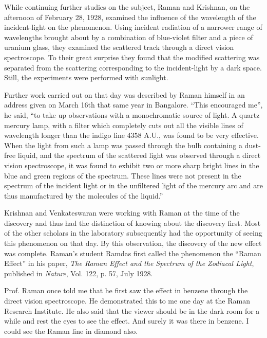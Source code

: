 While continuing further studies on the subject, Raman and\break
Krishnan, on the afternoon of February 28, 1928, examined the
influence of the wavelength of the incident-light on the
phenomenon. Using incident radiation of a narrower range of
wavelengths brought about by a combination of blue-violet filter
and a piece of uranium glass, they examined the scattered track
through a direct vision spectroscope. To their great surprise they
found that the modified scattering was separated from the
scattering corresponding to the incident-light by a dark space.
Still, the experiments were performed with sunlight.

Further work carried out on that day was described by
Raman himself in an address given on March 16th that same year
in Bangalore. ``This encouraged me'', he said, ``to take up
observations with a monochromatic source of light. A quartz
mercury lamp, with a filter which completely cuts out all the
visible lines of wavelength longer than the indigo line 4358 A.U.,
was found to be very effective. When the light from such a lamp
was passed through the bulb containing a dust-free liquid, and
the spectrum of the scattered light was observed through a direct
vision spectroscope, it was found to exhibit two or more sharp
bright lines in the blue and green regions of the spectrum. These
lines were not present in the spectrum of the incident light or
in the unfiltered light of the mercury arc and are thus manufactured by the molecules of the liquid.''

Krishnan and Venkateswaran were working with Raman at
the time of the discovery and thus had the distinction of knowing
about the discovery first. Most of the other scholars in the
laboratory subsequently had the opportunity of seeing this
phenomenon on that day. By this observation, the discovery of
the new effect was complete. Raman's student Ramdas first called
the phenomenon the ``Raman Effect'' in his paper, {\em The Raman
Effect and the Spectrum of the Zodiacal Light}, published in
{\em Nature}, Vol. 122, p. 57, July 1928.

Prof. Raman once told me that he first saw the effect in
benzene through the direct vision spectroscope. He demonstrated
this to me one day at the Raman Research Institute. He also said
that the viewer should be in the dark room for a while and rest
the eyes to see the effect. And surely it was there in benzene. I
could see the Raman line in diamond also.

